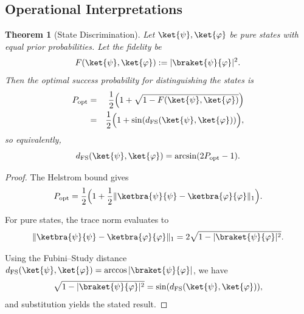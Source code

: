 \documentclass[aps,pra,reprint,nofootinbib,showpacs,superscriptaddress]{revtex4-1}
\newtheorem{theorem}{Theorem}[section]
\begin{document}








\subsection{Operational Interpretations}

\begin{theorem}[State Discrimination]
\label{thm:discrimination}
Let $\ket{\psi},\ket{\varphi}$ be pure states with equal prior probabilities. Let the fidelity be
\[
F(\ket{\psi},\ket{\varphi}) := |\braket{\psi}{\varphi}|^2.
\]
Then the optimal success probability for distinguishing the states is
\begin{eqnarray}
\notag 
P_{\text{opt}} &=& \frac{1}{2}\Big(1 + \sqrt{1 - F(\ket{\psi},\ket{\varphi})}\Big)\\
&=& \frac{1}{2}\Big(1 + \sin(d_{\text{FS}}(\ket{\psi},\ket{\varphi}))\Big),\notag
\end{eqnarray}
so equivalently,
\[
d_{\text{FS}}(\ket{\psi},\ket{\varphi}) = \arcsin(2 P_{\text{opt}} - 1).
\]
\end{theorem}

\begin{proof}
The Helstrom bound \cite{helstrom1969quantum} gives
\[
P_{\text{opt}} = \frac{1}{2} \Big(1 + \frac{1}{2}\|\ketbra{\psi}{\psi} - \ketbra{\varphi}{\varphi}\|_1\Big).
\]

For pure states, the trace norm evaluates to
\[
\|\ketbra{\psi}{\psi} - \ketbra{\varphi}{\varphi}\|_1 = 2 \sqrt{1 - |\braket{\psi}{\varphi}|^2}.
\]

Using the Fubini–Study distance $d_{\text{FS}}(\ket{\psi},\ket{\varphi}) = \arccos|\braket{\psi}{\varphi}|$, we have
\[
\sqrt{1 - |\braket{\psi}{\varphi}|^2} = \sin(d_{\text{FS}}(\ket{\psi},\ket{\varphi})),
\]
and substitution yields the stated result.
\end{proof}
\end{document}
